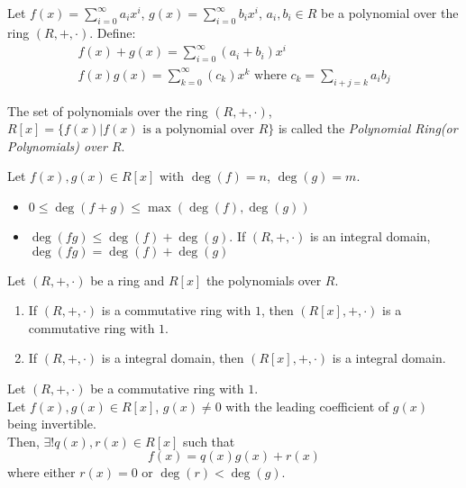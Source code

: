 \documentclass{report}
\begin{document}
		\begin{defn} \label{def_add_mult_polynomial}
			Let $f(x)=\sum_{i=0}^{\infty}a_ix^i$, $g(x)=\sum_{i=0}^{\infty}b_ix^i$, $a_i,b_i \in R$ be a polynomial over the ring $(R,+,\cdot)$. Define:
			\begin{gather*}
				f(x)+g(x)=\sum_{i=0}^{\infty}(a_i+b_i)x^i\\
				f(x)g(x)=\sum_{k=0}^{\infty}(c_k)x^k \text{ where } c_k=\sum_{i+j=k}a_ib_j
			\end{gather*}
		\end{defn}

		\begin{defn} \label{def_polynomial_ring}
			The set of polynomials over the ring $(R,+,\cdot)$, $R[x]=\{f(x)|f(x) \text{ is a polynomial over } R \}$ is called the \emph{Polynomial Ring(or Polynomials) over $R$}.
		\end{defn}

		\begin{thm} \label{thm_add_mult_deg}
			Let $f(x),g(x) \in R[x]$ with $\deg(f)=n$, $\deg(g)=m$.
			\begin{itemize}
				\item $0 \le \deg(f+g) \le \max(\deg(f),\deg(g))$
				\item $\deg(fg) \le \deg(f)+\deg(g)$.
				\subitem If $(R,+,\cdot)$ is an integral domain, $\deg(fg) = \deg(f)+\deg(g)$
			\end{itemize}
		\end{thm}

		\begin{thm} \label{thm_ring_polynomial_relationship}
			Let $(R,+,\cdot)$ be a ring and $R[x]$ the polynomials over $R$.
			\begin{enumerate}
				\item If $(R,+,\cdot)$ is a commutative ring with $1$, then $(R[x],+,\cdot)$ is a commutative ring with $1$.
				\item If $(R,+,\cdot)$ is a integral domain, then $(R[x],+,\cdot)$ is a integral domain.
			\end{enumerate}
		\end{thm}

		\begin{thm} \label{thm_polynomial_division_algorithm_ring}
			Let $(R,+,\cdot)$ be a commutative ring with $1$.\\
			Let $f(x),g(x) \in R[x]$, $g(x) \ne 0$ with the leading coefficient of $g(x)$ being invertible.\\
			Then, $\exists! q(x),r(x) \in R[x]$ such that
			\begin{displaymath}
				f(x)=q(x)g(x)+r(x)
			\end{displaymath}
			where either $r(x)=0$ or $\deg(r)<\deg(g)$.
		\end{thm}
\end{document}
